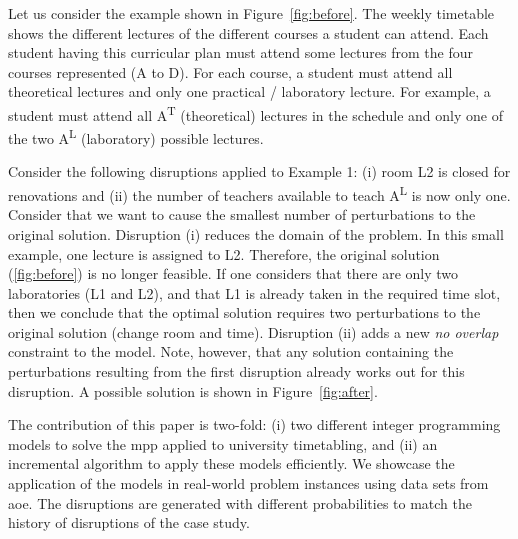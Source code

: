 \documentclass[runningheads]{llncs}
\newcommand{\uni}{\gls{aoe}}
\begin{document}
\begin{example}\label{ex:mov}
Let us consider the example shown in Figure~\ref{fig:before}. The weekly timetable shows the different lectures of the different courses a student can attend. Each student having this curricular plan must attend some lectures from the four courses represented (A to D). For each course, a student must attend all theoretical lectures and only one practical / laboratory lecture. For example, a student must attend all A\textsuperscript{T} (theoretical) lectures in the schedule and only one of the two A\textsuperscript{L} (laboratory) possible lectures. 


Consider the following disruptions applied to Example 1: (i) room L2 is closed for renovations and (ii) the number of teachers available to teach A\textsuperscript{L} is now only one. Consider that we want to cause the smallest number of perturbations to the original solution. Disruption (i) reduces the domain of the problem. In this small example, one lecture is assigned to L2. Therefore, the original solution (\ref{fig:before}) is no longer feasible. If one considers that there are only two laboratories (L1 and L2), and that L1 is already taken in the required time slot, then we conclude that the optimal solution requires two perturbations to the original solution (change room and time). Disruption (ii) adds a new {\em no overlap} constraint to the model. Note, however, that any solution containing the perturbations resulting from the first disruption already works out for this disruption. A possible solution is shown in Figure~\ref{fig:after}. 
\end{example}





The contribution of this paper is two-fold: (i) two different integer programming models to solve the \gls{mpp} applied to university timetabling, and (ii) an incremental algorithm to apply these models efficiently.   %
We showcase the application of the models in real-world problem instances using data sets from \uni. The disruptions are generated with different probabilities to match the history of disruptions of the case study.
\end{document}
